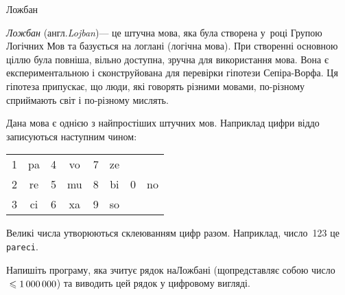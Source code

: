 \begin{problemAllDefault}{Ложбан}

\emph{Ложбан} (англ.\nolinebreak[3] \emph{Lojban})\nolinebreak[3] --- це штучна мова, яка була створена у~році Групою Логічних Мов та базується на логлані (логічна мова). При створенні основною ціллю була повніша, вільно доступна, зручна для використання мова. Вона є експериментальною і сконструйована для перевірки гіпотези Сепіра-Ворфа. Ця гіпотеза припускає, що люди, які говорять різними мовами, по-різному сприймають світ і по-різному мислять.

Дана мова є однією з найпростіших штучних мов. Наприклад цифри від\nolinebreak[1] до записуються наступним чином:

\begin{center}
\begin{ttfamily}
\begin{tabular}{cc@{ ~ ~ ~ }cc@{ ~ ~ ~ }cc@{ ~ ~ ~ }cc}
1 & pa	&	4 & vo	&	7 & ze				\\
2 & re	&	5 & mu	&	8 & bi	&	0 & no	\\
3 & ci	&	6 & xa	&	9 & so				
\end{tabular}
\end{ttfamily}

\end{center}

Великі числа утворюються склеюванням цифр разом. Наприклад, число~123 це \texttt{pareci}.

\Task	\hspace{0pt minus 0.5em}Напишіть програму, яка зчитує рядок на\nolinebreak[2] Ложбані (що\nolinebreak[3] представляє собою число${}\leqslant1\,000\,000$) та виводить цей рядок у цифровому вигляді.

\Example
\begin{exampleSimple}{5em}{3em}%
%
\end{exampleSimple}

\end{problemAllDefault}
